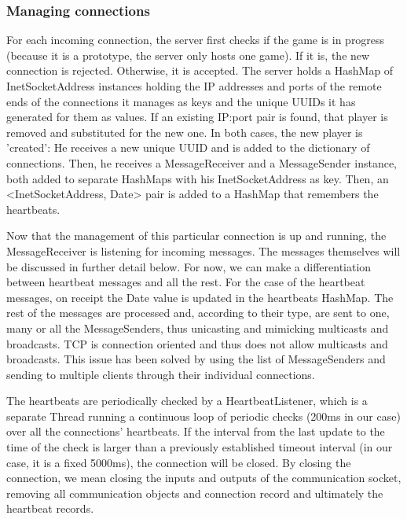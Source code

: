 \documentclass{article}
\begin{document}
\subsubsection{Managing connections}

For each incoming connection, the server first checks if the game is in
progress (because it is a prototype, the server only hosts one game). If it is,
the new connection is rejected. Otherwise, it is accepted. The server holds a
HashMap of InetSocketAddress instances holding the IP addresses and ports of the
remote ends of the connections it manages as keys and the unique UUIDs it has
generated for them as values. If an existing IP:port pair is found, that player
is removed and substituted for the new one. In both cases, the new player is
'created': He receives a new unique UUID and is added to the dictionary of
connections. Then, he receives a MessageReceiver and a MessageSender instance,
both added to separate HashMaps with his InetSocketAddress as key. Then, an
<InetSocketAddress, Date> pair is added to a HashMap that remembers the
heartbeats.\newline

Now that the management of this particular connection is up and running, the
MessageReceiver is listening for incoming messages. The messages themselves will
be discussed in further detail below. For now, we can make a differentiation
between heartbeat messages and all the rest. For the case of the heartbeat
messages, on receipt the Date value is updated in the heartbeats HashMap. The
rest of the messages are processed and, according to their type, are sent to
one, many or all the MessageSenders, thus unicasting and mimicking multicasts
and broadcasts. TCP is connection oriented and thus does not allow multicasts
and broadcasts. This issue has been solved by using the list of MessageSenders
and sending to multiple clients through their individual connections.\newline

The heartbeats are periodically checked by a HeartbeatListener, which is a
separate Thread running a continuous loop of periodic checks (200ms in our
case) over all the connections' heartbeats. If the interval from the last update
to the time of the check is larger than a previously established timeout
interval (in our case, it is a fixed 5000ms), the connection will be closed. By
closing the connection, we mean closing the inputs and outputs of the
communication socket, removing all communication objects and connection
record and ultimately the heartbeat records.\newline
\end{document}
